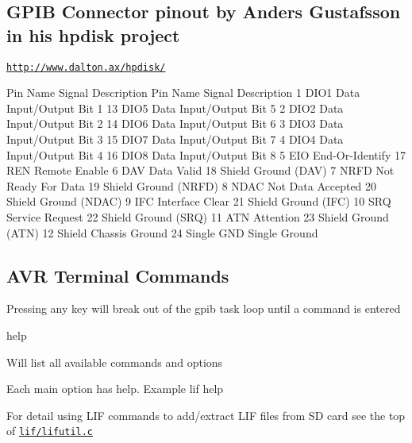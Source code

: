 \subsection*{G\+P\+IB Connector pinout by Anders Gustafsson in his hpdisk project}


\begin{DoxyItemize}
\item \href{http://www.dalton.ax/hpdisk/}{\tt http\+://www.\+dalton.\+ax/hpdisk/}
\end{DoxyItemize}


\begin{DoxyPre}
    Pin Name   Signal Description       Pin Name   Signal Description 
    1   DIO1   Data Input/Output Bit 1  13  DIO5   Data Input/Output Bit 5 
    2   DIO2   Data Input/Output Bit 2  14  DIO6   Data Input/Output Bit 6 
    3   DIO3   Data Input/Output Bit 3  15  DIO7   Data Input/Output Bit 7 
    4   DIO4   Data Input/Output Bit 4  16  DIO8   Data Input/Output Bit 8 
    5   EIO    End-Or-Identify          17  REN    Remote Enable 
    6   DAV    Data Valid               18  Shield Ground (DAV) 
    7   NRFD   Not Ready For Data       19  Shield Ground (NRFD) 
    8   NDAC   Not Data Accepted        20  Shield Ground (NDAC) 
    9   IFC    Interface Clear          21  Shield Ground (IFC) 
    10  SRQ    Service Request          22  Shield Ground (SRQ) 
    11  ATN    Attention                23  Shield Ground (ATN) 
    12  Shield Chassis Ground           24  Single GND Single Ground
\end{DoxyPre}


\subsection*{A\+VR Terminal Commands}


\begin{DoxyItemize}
\item Pressing any key will break out of the gpib task loop until a command is entered
\begin{DoxyItemize}
\item help
\begin{DoxyItemize}
\item Will list all available commands and options
\item Each main option has help. Example lif help
\end{DoxyItemize}
\item For detail using L\+IF commands to add/extract L\+IF files from SD card see the top of \href{lif/lifutil.c}{\tt lif/lifutil.\+c}
\end{DoxyItemize}
\end{DoxyItemize}





